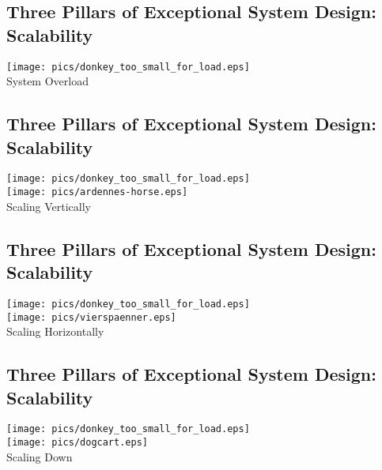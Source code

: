 \documentclass[xga]{xdvislides}
\begin{document}
\subsection{Three Pillars of Exceptional System Design: Scalability}
\vspace*{\fill}
\begin{center}
    \texttt{[image: pics/donkey\_too\_small\_for\_load.eps]} \\
	System Overload
\end{center}
\vspace*{\fill}

\subsection{Three Pillars of Exceptional System Design: Scalability}
\vspace*{\fill}
\begin{center}
    \texttt{[image: pics/donkey\_too\_small\_for\_load.eps]} \\
    \texttt{[image: pics/ardennes-horse.eps]} \\
	Scaling Vertically
\end{center}
\vspace*{\fill}


\subsection{Three Pillars of Exceptional System Design: Scalability}
\vspace*{\fill}
\begin{center}
    \texttt{[image: pics/donkey\_too\_small\_for\_load.eps]} \\
    \texttt{[image: pics/vierspaenner.eps]} \\
	Scaling Horizontally
\end{center}
\vspace*{\fill}

\subsection{Three Pillars of Exceptional System Design: Scalability}
\vspace*{\fill}
\begin{center}
    \texttt{[image: pics/donkey\_too\_small\_for\_load.eps]} \\
    \texttt{[image: pics/dogcart.eps]} \\
	Scaling Down
\end{center}
\vspace*{\fill}
\end{document}
